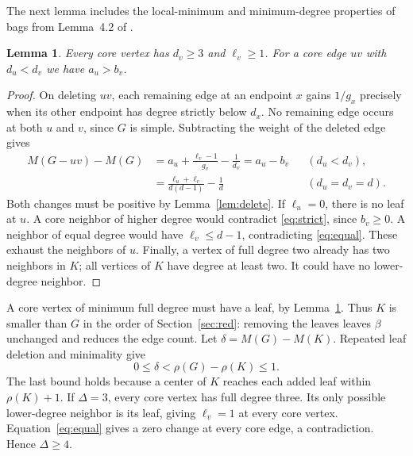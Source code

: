 \documentclass[11pt,a4paper]{article}
\newtheorem{lemma}[theorem]{Lemma}
\begin{document}
The next lemma includes the local-minimum and minimum-degree properties
of bags from Lemma~4.2 of \cite{CPS}.
\begin{lemma}\label{lem:local}
Every core vertex has $d_v\ge3$ and $\ell_v\ge1$. For a core edge $uv$
with $d_u<d_v$ we have $a_u>b_v$.
\end{lemma}
\begin{proof}
On deleting $uv$, each remaining edge at an endpoint $x$ gains $1/g_x$
precisely when its other endpoint has degree strictly below $d_x$.
No remaining edge occurs at both $u$ and $v$, since $G$ is simple.
Subtracting the weight of the deleted edge gives
\begin{align}
 M(G-uv)-M(G)
 &=a_u+\frac{\ell_v-1}{g_v}-\frac1{d_v}
   =a_u-b_v &&(d_u<d_v),\label{eq:strict}\\
 &=\frac{\ell_u+\ell_v}{d(d-1)}-\frac1d
   &&(d_u=d_v=d).\label{eq:equal}
\end{align}
Both changes must be positive by Lemma~\ref{lem:delete}. If
$\ell_u=0$, there is no leaf at $u$. A core neighbor of higher degree
would contradict \eqref{eq:strict}, since $b_v\ge0$. A neighbor of
equal degree would have $\ell_v\le d-1$, contradicting
\eqref{eq:equal}. These exhaust the neighbors of $u$. Finally, a
vertex of full degree two already has two neighbors in $K$; all
vertices of $K$ have degree at least two. It could have no lower-degree
neighbor.
\end{proof}

A core vertex of minimum full degree must have a leaf, by
Lemma~\ref{lem:local}. Thus $K$ is smaller than $G$ in the order of
Section~\ref{sec:red}: removing the leaves leaves $\beta$ unchanged
and reduces the edge count. Let $\delta=M(G)-M(K)$. Repeated leaf
deletion and minimality give
\begin{equation}\label{eq:delta}
 0\le\delta<\rho(G)-\rho(K)\le1 .
\end{equation}
The last bound holds because a center of $K$ reaches each added leaf
within $\rho(K)+1$. If $\Delta=3$, every core vertex has full degree
three. Its only possible lower-degree neighbor is its leaf, giving
$\ell_v=1$ at every core vertex. Equation~\eqref{eq:equal} gives a
zero change at every core edge, a contradiction. Hence $\Delta\ge4$.
\end{document}
